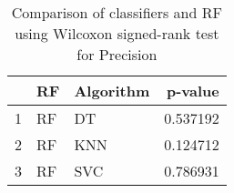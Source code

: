 \begin{table}
\footnotesize
\caption{Comparison of classifiers and RF using Wilcoxon signed-rank test for Precision}
\label{tab:RF wilcoxon Precision comparison}
\begin{tabular}{lllr}
\hline
 & RF & Algorithm & p-value \\
\hline
1 & RF & DT & 0.537192 \\
2 & RF & KNN & 0.124712 \\
3 & RF & SVC & 0.786931 \\
\hline
\end{tabular}
\end{table}
